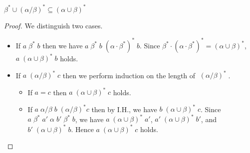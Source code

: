 \documentclass[12pt,aspectratio=169]{beamer}
\begin{document}
\newcommand{\bcab}{\;\beta^* \cup (\alpha/\beta)^*\;}
\newcommand{\bs}{\;\beta^*\;}
\newcommand{\acbs}{\;(\alpha \cup \beta)^* \;}
\newcommand{\asbs}{\;(\alpha/\beta)^*\;}


\begin{frame}
    \begin{lemma}
        $\beta^* \cup (\alpha/\beta)^* \subseteq (\alpha \cup \beta)^*$
    \end{lemma}
    \pause
    \begin{proof}
        We distinguish two cases.
        \pause
        \begin{itemize}
            \item If $a \bs b$ then we have $a\;\beta^* \;b\; (\alpha \cdot \beta^*)^*\;b$.
                \pause
            Since $\beta^* \cdot (\alpha \cdot \beta^*)^* = (\alpha \cup \beta)^*$, $a \acbs b$ holds.
                \pause
            \item If $a \asbs c$ then we perform induction on the length of $\asbs$.
                \begin{itemize}
                    \pause
                    \item If $a = c$ then $a \acbs c$ holds.
                    \pause
                    \item If $a \;\alpha/\beta\; b \; (\alpha/\beta)^* c$ then by I.H., we have $b \acbs c$.
                    \pause
                    Since $a \bs a' \; \alpha \; b' \bs b$, we have $a \acbs a'$, $a' \acbs b'$, and $b' \acbs b$.
                    \pause
                    Hence $a \acbs c$ holds.
                \end{itemize}
        \end{itemize}
    \end{proof}
\end{frame}
\end{document}
